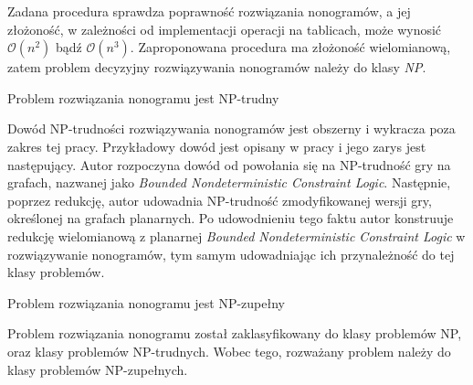    Zadana procedura sprawdza poprawność rozwiązania nonogramów, a jej złożoność, w zależności od
implementacji operacji na tablicach, może wynosić $\mathcal{O}(n^2)$ bądź $\mathcal{O}(n^3)$.
Zaproponowana procedura ma złożoność wielomianową, zatem problem decyzyjny rozwiązywania nonogramów
należy do klasy \textit{NP}.


\begin{theorem}
    Problem rozwiązania nonogramu jest NP-trudny
\end{theorem}
    Dowód NP-trudności rozwiązywania nonogramów jest obszerny i wykracza poza zakres tej pracy.
Przykładowy dowód jest opisany w pracy \cite{Nonograms-NP-Hard} i jego zarys jest następujący.
Autor rozpoczyna dowód od powołania się na NP-trudność gry na grafach, nazwanej jako
\textit{Bounded Nondeterministic Constraint Logic}. Następnie, poprzez redukcję, autor udowadnia 
NP-trudność zmodyfikowanej wersji gry, określonej na grafach planarnych. Po udowodnieniu tego faktu
autor konstruuje redukcję wielomianową z planarnej \textit{Bounded Nondeterministic Constraint Logic}
w rozwiązywanie nonogramów, tym samym udowadniając ich przynależność do tej klasy problemów.


\begin{theorem}
    Problem rozwiązania nonogramu jest NP-zupełny
\end{theorem}
    Problem rozwiązania nonogramu został zaklasyfikowany do klasy problemów NP, oraz klasy problemów
NP-trudnych. Wobec tego, rozważany problem należy do klasy problemów NP-zupełnych.

